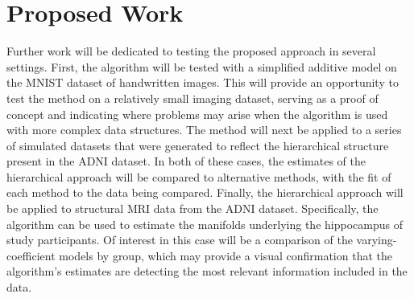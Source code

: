 \documentclass[11pt,reqno]{article}
\theoremstyle{definition}
\begin{document}
\section{Proposed Work}
Further work will be dedicated to testing the proposed approach in several settings. First, the algorithm will be tested with a simplified additive model on the MNIST dataset of handwritten images. This will provide an opportunity to test the method on a relatively small imaging dataset, serving as a proof of concept and indicating where problems may arise when the algorithm is used with more complex data structures. The method will next be applied to a series of simulated datasets that were generated to reflect the hierarchical structure present in the ADNI dataset. In both of these cases, the estimates of the hierarchical approach will be compared to alternative methods, with the fit of each method to the data being compared. Finally, the hierarchical approach will be applied to structural MRI data from the ADNI dataset. Specifically, the algorithm can be used to estimate the manifolds underlying the hippocampus of study participants. Of interest in this case will be a comparison of the varying-coefficient models by group, which may provide a visual confirmation that the algorithm's estimates are detecting the most relevant information included in the data.


\newpage

\nocite{*}
%
%
\printbibliography
\end{document}
